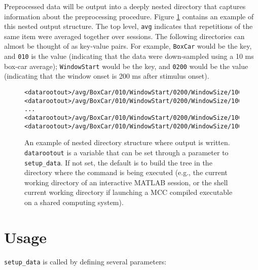 \documentclass[12pt,a4paper]{article}
\newcommand{\matlab}[0]{MATLAB\textsuperscript{\textregistered}}
\begin{document}
Preprocessed data will be output into a deeply nested directory that captures information about the preprocessing procedure.
Figure \ref{fig.nested_directory_output} contains an example of this nested output structure. The top level, \texttt{avg} indicates that repetitions of the same item were averaged together over sessions.
The following directories can almost be thought of as key-value pairs. For example, \texttt{BoxCar} would be the key, and \texttt{010} is the value (indicating that the data were down-sampled using a 10 ms box-car average);
\texttt{WindowStart} would be the key, and \texttt{0200} would be the value (indicating that the window onset is 200 ms after stimulus onset).

\begin{figure}
\begin{verbatim}
<datarootout>/avg/BoxCar/010/WindowStart/0200/WindowSize/1000/s01_raw.mat
<datarootout>/avg/BoxCar/010/WindowStart/0200/WindowSize/1000/s02_raw.mat
...
<datarootout>/avg/BoxCar/010/WindowStart/0200/WindowSize/1000/sNN_raw.mat
<datarootout>/avg/BoxCar/010/WindowStart/0200/WindowSize/1000/metadata_raw.mat
\end{verbatim}
\caption{
	An example of nested directory structure where output is written.
	\texttt{datarootout} is a variable that can be set through a parameter to \texttt{setup\_data}.
	If not set, the default is to build the tree in the directory where the command is being executed (e.g., the current working directory of an interactive \matlab{} session, or the shell current working directory if launching a MCC compiled executable on a shared computing system).
}
\label{fig.nested_directory_output}
\end{figure}

\section{Usage}

\texttt{setup\_data} is called by defining several parameters:
\end{document}

